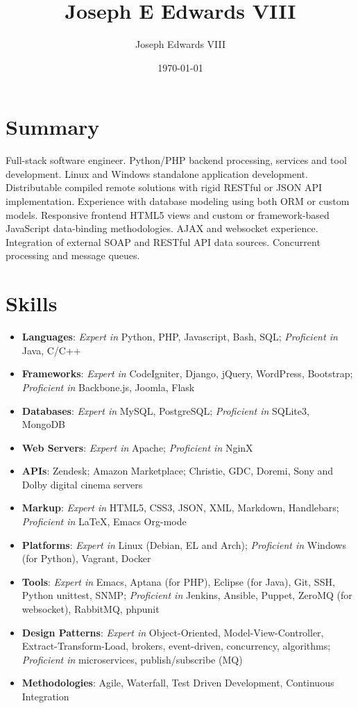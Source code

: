\documentclass[letterpaper]{article}
\author{Joseph Edwards VIII}
\date{\today}
\title{Joseph E Edwards VIII}
\begin{document}
\maketitle
{}

\section{Summary}
\label{sec-1}

Full-stack software engineer. Python/PHP backend processing, services and tool development. Linux and Windows standalone application development. Distributable compiled remote solutions with rigid RESTful or JSON API implementation. Experience with database modeling using both ORM or custom models. Responsive frontend HTML5 views and custom or framework-based JavaScript data-binding methodologies. AJAX and websocket experience. Integration of external SOAP and RESTful API data sources. Concurrent processing and message queues.

\section{Skills}
\label{sec-2}

\begin{itemize}
\item \textbf{Languages}: \emph{Expert in} Python, PHP, Javascript, Bash, SQL; \emph{Proficient in} Java, C/C++
\item \textbf{Frameworks}: \emph{Expert in} CodeIgniter, Django, jQuery, WordPress, Bootstrap; \emph{Proficient in} Backbone.js, Joomla, Flask
\item \textbf{Databases}: \emph{Expert in} MySQL, PostgreSQL; \emph{Proficient in} SQLite3, MongoDB
\item \textbf{Web Servers}: \emph{Expert in} Apache; \emph{Proficient in} NginX
\item \textbf{APIs}: Zendesk; Amazon Marketplace; Christie, GDC, Doremi, Sony and Dolby digital cinema servers
\item \textbf{Markup}: \emph{Expert in} HTML5, CSS3, JSON, XML, Markdown, Handlebars; \emph{Proficient in} \LaTeX{}, Emacs Org-mode
\item \textbf{Platforms}: \emph{Expert in} Linux (Debian, EL and Arch); \emph{Proficient in} Windows (for Python), Vagrant, Docker
\item \textbf{Tools}: \emph{Expert in} Emacs, Aptana (for PHP), Eclipse (for Java), Git, SSH, Python unittest, SNMP; \emph{Proficient in} Jenkins, Ansible, Puppet, ZeroMQ (for websocket), RabbitMQ, phpunit
\item \textbf{Design Patterns}: \emph{Expert in} Object-Oriented, Model-View-Controller, Extract-Transform-Load, brokers, event-driven, concurrency, algorithms; \emph{Proficient in} microservices, publish/subscribe (MQ)
\item \textbf{Methodologies}: Agile, Waterfall, Test Driven Development, Continuous Integration
\end{itemize}
\end{document}

